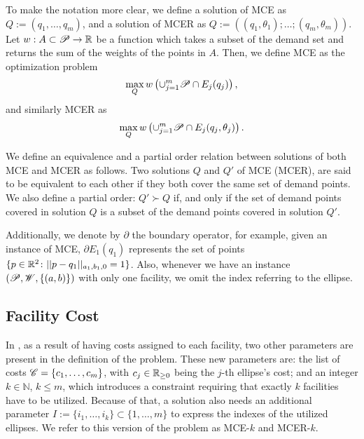 To make the notation more clear, we define a solution of MCE as $Q:=(q_1, \dots, q_m)$, and a solution of MCER as $Q:=((q_1, \theta_1); \dots; (q_m, \theta_m))$. 
Let $w : A \subset \mathscr{P} \to \mathbb{R}$ be a function which takes a subset of the demand set and returns the sum of the weights of the points in $A$. Then, we define MCE  as the optimization problem 
\begin{equation*}
\max_{Q}  w\left(\cup_{j=1}^m\mathscr{P} \cap E_j(q_j)\right),
\end{equation*}
and similarly MCER as
\begin{equation*}
\max_{Q} w\left(\cup_{j=1}^m\mathscr{P} \cap E_j(q_j, \theta_j)\right).
\end{equation*}

We define an equivalence and a partial order relation between solutions of both MCE and MCER as follows.
Two solutions $Q$ and $Q'$ of MCE (MCER), are said to be equivalent to each other if
they both cover the same set of demand points.
We also define a partial order: $Q' \succ Q$ if, and only if the set of demand points covered in solution $Q$ is a subset of the demand points covered in solution $Q'$.


Additionally, we denote by $\partial$ the boundary operator, for example, given an instance of MCE, $\partial E_1(q_1)$ represents the set of points $\{p \in \mathbb{R}^2\colon ||p-q_1||_{a_1,b_1,0} = 1\}$. Also, whenever we have an instance $(\mathscr{P}, \mathscr{W}, \{(a, b)\})$ with only one facility, we omit the index referring to the ellipse. 

\subsection{Facility Cost}

In \cite{canbolat, andreta}, as a result of having costs assigned to each facility, two other parameters are present in the definition of the problem.
These new parameters are: the list of costs $\mathscr{C}=\{c_1, \dots, c_m\}$, with $c_j\in\mathbb{R}_{\ge0}$ being the $j$-th ellipse's cost; 
and an integer $k\in\mathbb{N}$, $k\le m$, which introduces a constraint requiring that exactly $k$ facilities have to be utilized.
Because of that, a solution also needs an additional parameter $I:=\{i_1, \dots, i_k\}\subset\{1, \dots, m\}$ to express the indexes of the utilized ellipses. We refer to this version of the problem as  MCE-$k$ and MCER-$k$.


